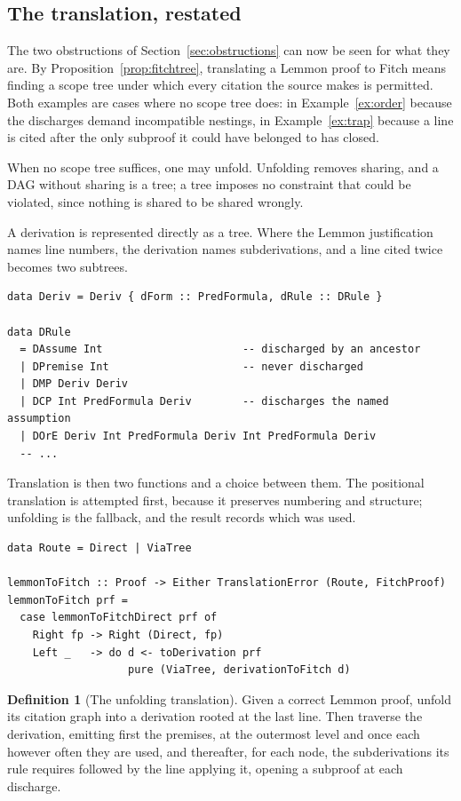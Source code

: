 \documentclass[11pt]{article}
\theoremstyle{plain}
\theoremstyle{definition}
\newtheorem{definition}[theorem]{Definition}
\theoremstyle{remark}
\begin{document}
\subsection{The translation, restated}

The two obstructions of Section~\ref{sec:obstructions} can now be seen for
what they are. By Proposition~\ref{prop:fitchtree}, translating a Lemmon proof
to Fitch means finding a scope tree under which every citation the source
makes is permitted. Both examples are
cases where no scope tree does: in Example~\ref{ex:order} because the
discharges demand incompatible nestings, in Example~\ref{ex:trap} because a
line is cited after the only subproof it could have belonged to has closed.

When no scope tree suffices, one may unfold. Unfolding removes sharing, and a
DAG without sharing is a tree; a tree imposes no constraint that could be
violated, since nothing is shared to be shared wrongly.

A derivation is represented directly as a tree. Where the Lemmon
justification names line numbers, the derivation names subderivations, and a
line cited twice becomes two subtrees.

\begin{lstlisting}
data Deriv = Deriv { dForm :: PredFormula, dRule :: DRule }

data DRule
  = DAssume Int                      -- discharged by an ancestor
  | DPremise Int                     -- never discharged
  | DMP Deriv Deriv
  | DCP Int PredFormula Deriv        -- discharges the named assumption
  | DOrE Deriv Int PredFormula Deriv Int PredFormula Deriv
  -- ...
\end{lstlisting}

Translation is then two functions and a choice between them. The positional
translation is attempted first, because it preserves numbering and structure;
unfolding is the fallback, and the result records which was used.

\begin{lstlisting}
data Route = Direct | ViaTree

lemmonToFitch :: Proof -> Either TranslationError (Route, FitchProof)
lemmonToFitch prf =
  case lemmonToFitchDirect prf of
    Right fp -> Right (Direct, fp)
    Left _   -> do d <- toDerivation prf
                   pure (ViaTree, derivationToFitch d)
\end{lstlisting}

\begin{definition}[The unfolding translation]\label{def:construction}
Given a correct Lemmon proof, unfold its citation graph into a derivation
rooted at the last line. Then traverse the derivation, emitting first the
premises, at the outermost level and once each however often they are used,
and thereafter, for each node, the subderivations its rule requires followed
by the line applying it, opening a subproof at each discharge.
\end{definition}
\end{document}
